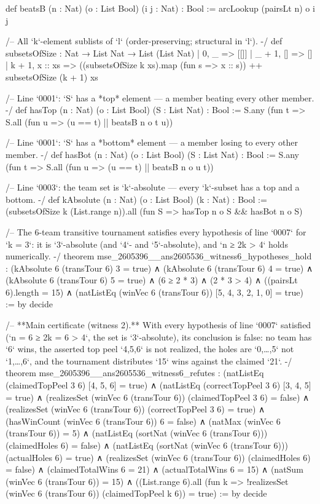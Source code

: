 \documentclass[11pt]{article}
\begin{document}
\begin{Vlean}
def beatsB (n : Nat) (o : List Bool) (i j : Nat) : Bool := arcLookup (pairsLt n) o i j

/-- All `k`-element sublists of `l` (order-preserving; structural in `l`). -/
def subsetsOfSize : Nat → List Nat → List (List Nat)
  | 0, _ => [[]]
  | _ + 1, [] => []
  | k + 1, x :: xs => ((subsetsOfSize k xs).map (fun s => x :: s)) ++ subsetsOfSize (k + 1) xs

/-- Line `0001`: `S` has a *top* element — a member beating every other member. -/
def hasTop (n : Nat) (o : List Bool) (S : List Nat) : Bool :=
  S.any (fun t => S.all (fun u => (u == t) || beatsB n o t u))

/-- Line `0001`: `S` has a *bottom* element — a member losing to every other member. -/
def hasBot (n : Nat) (o : List Bool) (S : List Nat) : Bool :=
  S.any (fun t => S.all (fun u => (u == t) || beatsB n o u t))

/-- Line `0003`: the team set is `k`-absolute — every `k`-subset has a top and a bottom. -/
def kAbsolute (n : Nat) (o : List Bool) (k : Nat) : Bool :=
  (subsetsOfSize k (List.range n)).all (fun S => hasTop n o S && hasBot n o S)

/-- The 6-team transitive tournament satisfies every hypothesis of line `0007` for `k = 3`:
it is `3`-absolute (and `4`- and `5`-absolute), and `n ≥ 2k > 4` holds numerically. -/
theorem mse_2605396__ans2605536_witness6_hypotheses_hold :
    (kAbsolute 6 (transTour 6) 3 = true)
  ∧ (kAbsolute 6 (transTour 6) 4 = true)
  ∧ (kAbsolute 6 (transTour 6) 5 = true)
  ∧ (6 ≥ 2 * 3) ∧ (2 * 3 > 4)
  ∧ ((pairsLt 6).length = 15)
  ∧ (natListEq (winVec 6 (transTour 6)) [5, 4, 3, 2, 1, 0] = true) := by decide

/-- **Main certificate (witness 2).**  With every hypothesis of line `0007` satisfied
(`n = 6 ≥ 2k = 6 > 4`, the set is `3`-absolute), its conclusion is false: no team has `6`
wins, the asserted top peel `{4,5,6}` is not realized, the holes are `{0,…,5}` not `{1,…,6}`,
and the tournament distributes `15` wins against the claimed `21`. -/
theorem mse_2605396__ans2605536_witness6_refutes :
    (natListEq (claimedTopPeel 3 6) [4, 5, 6] = true)
  ∧ (natListEq (correctTopPeel 3 6) [3, 4, 5] = true)
  ∧ (realizesSet (winVec 6 (transTour 6)) (claimedTopPeel 3 6) = false)
  ∧ (realizesSet (winVec 6 (transTour 6)) (correctTopPeel 3 6) = true)
  ∧ (hasWinCount (winVec 6 (transTour 6)) 6 = false)
  ∧ (natMax (winVec 6 (transTour 6)) = 5)
  ∧ (natListEq (sortNat (winVec 6 (transTour 6))) (claimedHoles 6) = false)
  ∧ (natListEq (sortNat (winVec 6 (transTour 6))) (actualHoles 6) = true)
  ∧ (realizesSet (winVec 6 (transTour 6)) (claimedHoles 6) = false)
  ∧ (claimedTotalWins 6 = 21)
  ∧ (actualTotalWins 6 = 15)
  ∧ (natSum (winVec 6 (transTour 6)) = 15)
  ∧ ((List.range 6).all (fun k =>
        !realizesSet (winVec 6 (transTour 6)) (claimedTopPeel k 6)) = true) := by decide


\end{Vlean}
\end{document}
